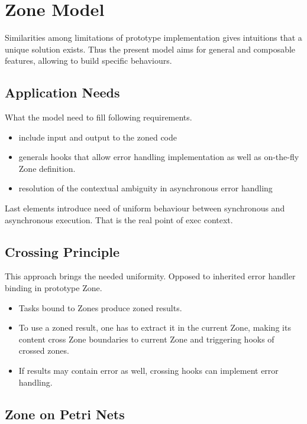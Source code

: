 
\chapter{Zone Model}

Similarities among limitations of prototype implementation gives intuitions that a unique solution exists. Thus the present model aims for general and composable features, allowing to build specific behaviours.

\section{Application Needs}

What the model need to fill following requirements.

\begin{itemize}
\item include input and output to the zoned code
\item generals hooks that allow error handling implementation as well as on-the-fly Zone definition.
\item resolution of the contextual ambiguity in asynchronous error handling
\end{itemize}

Last elements introduce need of uniform behaviour between synchronous and asynchronous execution.
That is the real point of exec context.

\section{Crossing Principle}

This approach brings the needed uniformity. Opposed to inherited error handler binding in prototype Zone.

\begin{itemize}
\item Tasks bound to Zones produce zoned results.
\item To use a zoned result, one has to extract it in the current Zone, making its content cross Zone boundaries to current Zone and triggering hooks of crossed zones.
\item If results may contain error as well, crossing hooks can implement error handling.
\end{itemize}

\section{Zone on Petri Nets}


